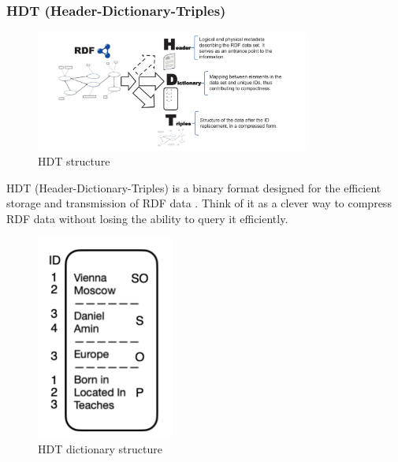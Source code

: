 \subsubsection{HDT (Header-Dictionary-Triples)}

\begin{figure}[htbp]
    \centering
    \includegraphics[width=0.8\textwidth]{9.png}
    \caption{HDT structure \citep{fernandez2013binary}}
    \label{fig:image9}
\end{figure}

HDT (Header-Dictionary-Triples) is a binary format designed for the efficient storage and transmission of RDF data \citep{fernandez2013binary}. Think of it as a clever way to compress RDF data without losing the ability to query it efficiently.


\begin{figure}[htbp]
    \centering
    \includegraphics[width=0.4\textwidth]{10.png}
    \caption{HDT dictionary structure}
    \label{fig:image10}
\end{figure}

